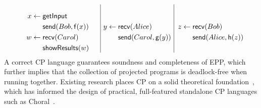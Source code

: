 \[
\begin{minipage}{.35\textwidth}
  \begin{equation*}
    \begin{split}
      x \leftarrow \; & \mathsf{getInput} \\
                      & \mathsf{send}(Bob, \mathsf{f}(x)) \\
      w \leftarrow \; & \mathsf{recv}(Carol) \\
                      & \mathsf{showResults}(w)
    \end{split}
  \end{equation*}
\end{minipage}
\hfill\vline\hfill
\begin{minipage}{.3\textwidth}
  \begin{equation*}
    \begin{split}
      y \leftarrow \; & \mathsf{recv}(Alice) \\
                      & \mathsf{send}(Carol, \mathsf{g}(y)) \\
    \end{split}
  \end{equation*}
\end{minipage}
\hfill\vline\hfill
\begin{minipage}{.3\textwidth}
  \begin{equation*}
    \begin{split}
      z \leftarrow \; & \mathsf{recv}(Bob) \\
                      & \mathsf{send}(Alice, \mathsf{h}(z)) \\
    \end{split}
  \end{equation*}
\end{minipage}
\]
%
A correct CP language guarantees soundness and completeness of EPP, which further implies that the collection of projected programs is deadlock-free when running together.
%
Existing research places CP on a solid theoretical foundation~\citep{montesi-2013, cruzfilipe-2020, cruzfilipe-2022, hirsch-2022},
%
which has informed the design of practical, full-featured standalone CP languages such as Choral~\citep{giallorenzo-2024}.



